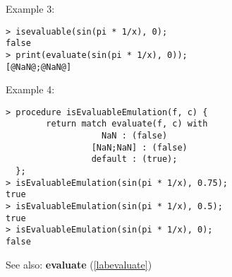 \noindent Example 3: 
\begin{center}\begin{minipage}{15cm}\begin{Verbatim}[frame=single]
> isevaluable(sin(pi * 1/x), 0);
false
> print(evaluate(sin(pi * 1/x), 0));
[@NaN@;@NaN@]
\end{Verbatim}
\end{minipage}\end{center}
\noindent Example 4: 
\begin{center}\begin{minipage}{15cm}\begin{Verbatim}[frame=single]
> procedure isEvaluableEmulation(f, c) {
        return match evaluate(f, c) with 
                   NaN : (false)
                 [NaN;NaN] : (false)
                 default : (true);
  };
> isEvaluableEmulation(sin(pi * 1/x), 0.75);
true
> isEvaluableEmulation(sin(pi * 1/x), 0.5);
true
> isEvaluableEmulation(sin(pi * 1/x), 0);
false
\end{Verbatim}
\end{minipage}\end{center}
See also: \textbf{evaluate} (\ref{labevaluate})
